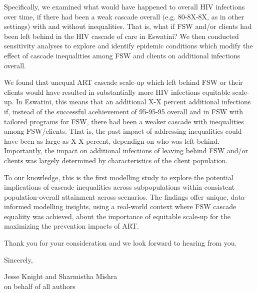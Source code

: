 Specifically, we examined what would have happened to overall HIV infections over time, 
if there had been a weak cascade overall (e.g. 80-8X-8X, as in other settings) with and without inequalities. That is,
what if FSW and/or clients had been left behind in the HIV cascade of care in Eswatini? 
We then conducted sensitivity analyses to explore and identify epidemic conditions which modify
the effect of cascade inequalities among FSW and clients on additional infections overall.
\par
We found that unequal ART cascade scale-up which left behind FSW or their clients %
would have resulted in substantially more HIV infections \vs equitable scale-up.
In Eswatini, this means that an additional X-X percent additional infections if, %
instead of the successful acehievement of 95-95-95 overall and in FSW
with tailored programs for FSW, there had been a weaker cascade with inequalities among FSW/clients.
That is, the past impact of addressing inequalities could have been as large as X-X percent, dependign on who was left behind.
Importantly, the impact on additional infections of
leaving behind FSW and/or clients was largely determined by
characteristics of the client population.
\par
To our knowledge, this is the first modelling study to explore
the potential implications of cascade inequalities across subpopulations
within consistent population-overall attainment across scenarios. %
The findings offer unique, data-informed modelling insights, using a real-world context where FSW cascade equaliity was achieved,
about the importance of equitable scale-up
for the maximizing the prevention impacts of ART.
\par
Thank you for your consideration and we look forward to hearing from you.
\medskip\par
Sincerely,
\par
Jesse Knight and Sharmistha Mishra\\
on behalf of all authors
